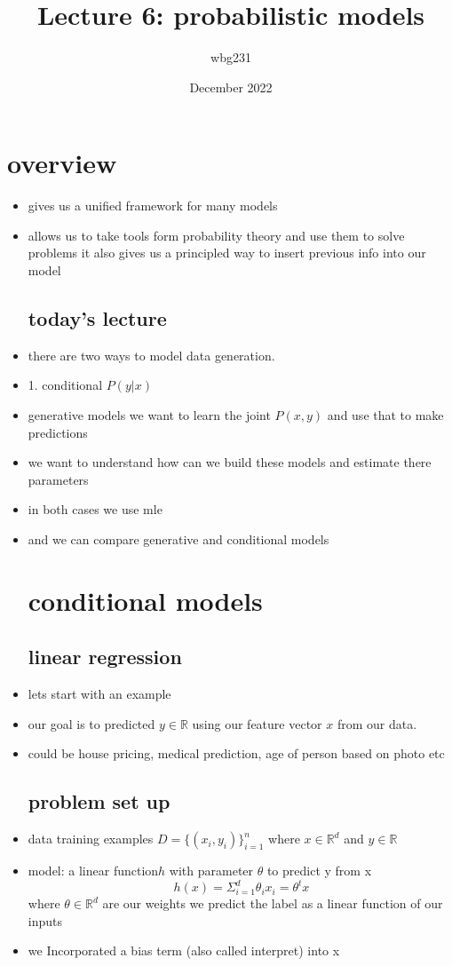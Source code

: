 \documentclass{article}
\title{Lecture 6: probabilistic models}
\author{wbg231 }
\date{December 2022}
\begin{document}
\maketitle

\section{overview}
\begin{itemize}
\subsection{why probabilistic models}
\item gives us a unified framework for many models 
\item allows us to take tools form probability theory and use them to solve problems 
\itme it also gives us a principled way to insert previous info into our model 
\subsection{today's lecture}
\item there are two ways to model data generation. \item 1. conditional $P(y|x)$
\item generative models we want to learn the joint $P(x,y)$ and use that to make predictions 
\item we want to understand how can we build these models and estimate there parameters 
\item in both cases we use mle 
\item and we can compare generative and conditional models 
\section{conditional models}
\subsection{linear regression}
\item lets start with an example
\item our goal is to predicted $y\in \mathbb{R}$ using our feature vector $x$ from our data. 
\item could be house pricing, medical prediction, age of person based on photo etc
\subsection{problem set up}
\item data training examples $D=\{(x_i,y_i)\}_{i=1}^{n}$ where $x\in \mathbb{R}^d$ and $y\in\mathbb{R}$
\item model: a linear function$ h$ with parameter $\theta$ to predict y from x $$h(x)=\Sigma_{i=1}^{d}\theta_ix_i=\theta^tx$$ where $\theta\in\mathbb{R}^d$ are our weights
\itme we predict the label as a linear function of our inputs 
\item we Incorporated a bias term (also called interpret) into x

\end{itemize}
\end{document}

